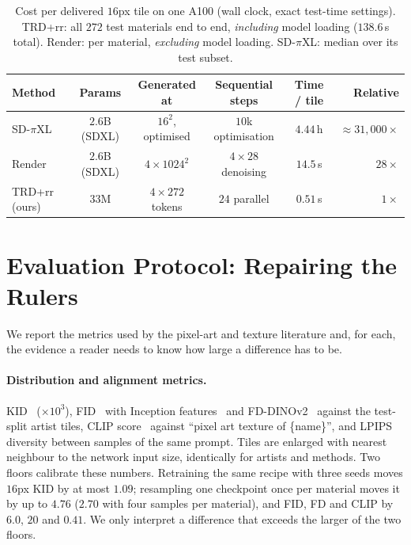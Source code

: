 \documentclass{article}
\newcommand{\trd}{\textsc{TRD}}
\begin{document}
\begin{table}[t]
\caption{Cost per delivered $16$px tile on one A100 (wall clock, exact
test-time settings). \trd{}+rr: all $272$ test materials end to end,
\emph{including} model loading ($138.6$\,s total). Render: per material,
\emph{excluding} model loading. SD-$\pi$XL: median over its test subset.}
\label{tab:speed}
\centering
\small
\begin{tabular}{@{}lccccr@{}}
\toprule
Method & Params & Generated at & Sequential steps & Time / tile & Relative \\
\midrule
SD-$\pi$XL & $2.6$B (SDXL) & $16^2$, optimised & $10$k optimisation & $4.44$\,h & $\approx31{,}000\times$ \\
Render & $2.6$B (SDXL) & $4\times1024^2$ & $4\times28$ denoising & $14.5$\,s & $28\times$ \\
\trd{}+rr (ours) & $33$M & $4\times272$ tokens & $24$ parallel & $\mathbf{0.51}$\,s & $1\times$ \\
\bottomrule
\end{tabular}
\end{table}

\section{Evaluation Protocol: Repairing the Rulers}
\label{sec:protocol}

We report the metrics used by the pixel-art and texture literature and, for
each, the evidence a reader needs to know how large a difference has to be.

\paragraph{Distribution and alignment metrics.} KID~\citep{binkowski2018kid}
($\times10^3$), FID~\citep{heusel2017fid} with Inception
features~\citep{szegedy2016inception} and FD-DINOv2~\citep{stein2023exposing}
against the test-split artist tiles, CLIP score~\citep{hessel2021clipscore}
against ``pixel art texture of \{name\}'', and LPIPS~\citep{zhang2018lpips}
diversity between samples of the same prompt. Tiles are enlarged with nearest
neighbour to the network input size, identically for artists and methods.
Two floors calibrate these numbers. Retraining the same recipe with three
seeds moves $16$px KID by at most $1.09$; resampling one checkpoint once per
material moves it by up to $4.76$ ($2.70$ with four samples per material), and
FID, FD and CLIP by $6.0$, $20$ and $0.41$. We only interpret a difference
that exceeds the larger of the two floors.
\end{document}
